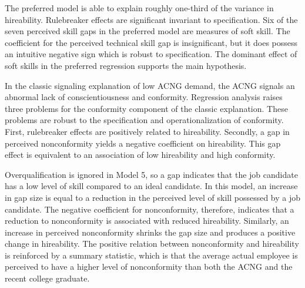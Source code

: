 \documentclass[review]{elsarticle}
\begin{document}
The preferred model is able to explain roughly one-third of the variance in hireability.
Rulebreaker effects are significant invariant to specification.
Six of the seven perceived skill gaps in the preferred model are measures of soft skill.
The coefficient for the perceived technical skill gap is insignificant, but it does possess an intuitive negative sign which is robust to specification.
The dominant effect of soft skills in the preferred regression supports the main hypothesis.

In the classic signaling explanation of low ACNG demand, the ACNG signals an abnormal lack of conscientiousness and conformity.
Regression analysis raises three problems for the conformity component of the classic explanation.
These problems are robust to the specification and operationalization of conformity.
First, rulebreaker effects are positively related to hireability.
Secondly, a gap in perceived nonconformity yields a negative coefficient on hireability.
This gap effect is equivalent to an association of low hireability and high conformity.

Overqualification is ignored in Model 5, so a gap indicates that the job candidate has a low level of skill compared to an ideal candidate.
In this model, an increase in gap size is equal to a reduction in the perceived level of skill possessed by a job candidate.
The negative coefficient for nonconformity, therefore,
indicates that a reduction to nonconformity is associated with reduced hireability.
Similarly, an increase in perceived nonconformity shrinks the gap size and produces a positive change in hireability.
The positive relation between nonconformity and hireability is reinforced by a summary statistic,
which is that the average actual employee is perceived to have a higher level of nonconformity than both the ACNG and the recent college graduate.
\end{document}
